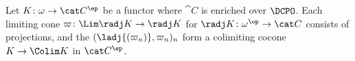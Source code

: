 \begin{theorem}
\label{thm:proof:scott:limcolim}
Let $K \colon \omega \to \cat C^\ep$ be a functor
where $\cat C$ is enriched over $\DCPO$.
Each limiting cone $\varpi \colon \Lim \radj K \to \radj K$
for $\radj K \colon \omega^\op \to \cat C$ consists of projections,
and the $(\ladj{(\varpi_n)},\varpi_n)_n$
form a colimiting cocone
$K \to \Colim K$ in $\cat C^\ep$.
\end{theorem}

